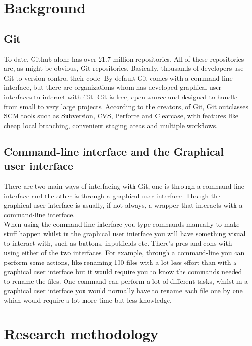 \documentclass[12pt,a4paper,article,compsoc]{IEEEtran}
\begin{document}
		\section{Background}
			\subsection{Git}
			To date, Github alone has over 21.7 million repositories.\cite{GithubAbout} All of these repositories are, as might be obvious, Git repositories. Basically, thousands of developers use Git to version control their code.\cite{GitUserSurvey}
			By default Git comes with a command-line interface, but there are organizations whom has developed graphical user interfaces to interact with Git.
			Git is free, open source and designed to handle from small to very large projects.
			According to the creators, of Git, Git outclasses SCM tools such as Subversion, CVS, Perforce and Clearcase, with features like cheap local branching, convenient staging areas and multiple workflows.\cite{GitHomepage}
			
			\subsection{Command-line interface and the Graphical user interface}
			There are two main ways of interfacing with Git, one is through a command-line interface and the other is through a graphical user interface.
			Though the graphical user interface is usually, if not always, a wrapper that interacts with a command-line interface.\\
			When using the command-line interface you type commands manually to make stuff happen whilst in the graphical user interface you will have something visual to interact with, such as buttons, inputfields etc.
			There's pros and cons with using either of the two interfaces.
			For example, through a command-line you can perform some actions, like renaming 100 files with a lot less effort than with a graphical user interface but it would require you to know the commands needed to rename the files. One command can perform a lot of different tasks, whilst in a graphical user interface you would normally have to rename each file one by one which would require a lot more time but less knowledge.
			
			
			
		\section{Research methodology}
\end{document}
